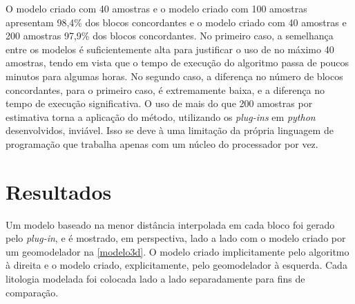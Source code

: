 O modelo criado com 40 amostras e o modelo criado com 100 amostras apresentam 98,4\% dos blocos concordantes e o modelo criado com 40 amostras e 200 amostras 97,9\% dos blocos concordantes. No primeiro caso, a semelhança entre os modelos é suficientemente alta para justificar o uso de no máximo 40 amostras, tendo em vista que o tempo de execução do algoritmo passa de poucos minutos para algumas horas. No segundo caso, a diferença no número de blocos concordantes, para o primeiro caso, é extremamente baixa, e a diferença no tempo de execução significativa. O uso de mais do que 200 amostras por estimativa torna a aplicação do método, utilizando os \textit{plug-ins} em \textit{python} desenvolvidos, inviável. Isso se deve à uma limitação da própria linguagem de programação que trabalha apenas com um núcleo do processador por vez.

\section{Resultados}

Um modelo baseado na menor distância interpolada em cada bloco foi gerado pelo \textit{plug-in}, e é mostrado, em perspectiva, lado a lado com o modelo criado por um geomodelador na \autoref{modelo3d}. O modelo criado implicitamente pelo algoritmo à direita e o modelo criado, explicitamente, pelo geomodelador à esquerda. Cada litologia modelada foi colocada lado a lado separadamente para fins de comparação. 

